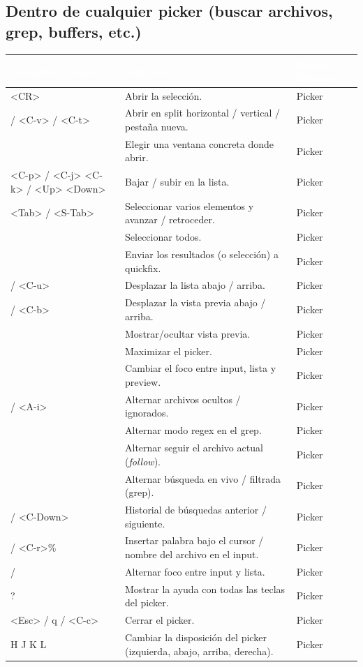\documentclass[8pt,a4paper,landscape]{extarticle}
\newenvironment{cht}{%
  \begin{longtable}{>{\raggedright\arraybackslash\ttfamily}p{0.27\textwidth}
                    >{\raggedright\arraybackslash}p{0.46\textwidth}
                    >{\raggedright\arraybackslash}p{0.21\textwidth}}
  \rowcolor{accent}\textcolor{white}{\textbf{\rmfamily Comando / atajo}} &
  \textcolor{white}{\textbf{Qué hace}} & \textcolor{white}{\textbf{Dónde funciona}} \\
  \endhead
}{\end{longtable}}
\newcommand{\rr}[3]{#1 & #2 & #3 \\}
\newcommand{\rg}[3]{\rowcolor{rowgray}\relax #1 & #2 & #3 \\}
\let\oldsubsection\subsection
\renewcommand{\subsection}{\Needspace{9\baselineskip}\oldsubsection}
\begin{document}
\subsection{Dentro de cualquier picker (buscar archivos, grep, buffers, etc.)}
\begin{cht}
\rg{<CR>}{Abrir la selección.}{Picker}
\rr{<C-s> / <C-v> / <C-t>}{Abrir en split horizontal / vertical / pestaña nueva.}{Picker}
\rg{<S-CR>}{Elegir una ventana concreta donde abrir.}{Picker}
\rr{<C-n> <C-p> / <C-j> <C-k> / <Up> <Down>}{Bajar / subir en la lista.}{Picker}
\rg{<Tab> / <S-Tab>}{Seleccionar varios elementos y avanzar / retroceder.}{Picker}
\rr{<C-a>}{Seleccionar todos.}{Picker}
\rg{<C-q>}{Enviar los resultados (o selección) a quickfix.}{Picker}
\rr{<C-d> / <C-u>}{Desplazar la lista abajo / arriba.}{Picker}
\rg{<C-f> / <C-b>}{Desplazar la vista previa abajo / arriba.}{Picker}
\rr{<A-p>}{Mostrar/ocultar vista previa.}{Picker}
\rg{<A-m>}{Maximizar el picker.}{Picker}
\rr{<A-w>}{Cambiar el foco entre input, lista y preview.}{Picker}
\rg{<A-h> / <A-i>}{Alternar archivos ocultos / ignorados.}{Picker}
\rr{<A-r>}{Alternar modo regex en el grep.}{Picker}
\rg{<A-f>}{Alternar seguir el archivo actual (\emph{follow}).}{Picker}
\rr{<C-g>}{Alternar búsqueda en vivo / filtrada (grep).}{Picker}
\rg{<C-Up> / <C-Down>}{Historial de búsquedas anterior / siguiente.}{Picker}
\rr{<C-r><C-w> / <C-r>\%}{Insertar palabra bajo el cursor / nombre del archivo en el input.}{Picker}
\rg{/}{Alternar foco entre input y lista.}{Picker}
\rr{? }{Mostrar la ayuda con todas las teclas del picker.}{Picker}
\rg{<Esc> / q / <C-c>}{Cerrar el picker.}{Picker}
\rr{<C-w>H J K L}{Cambiar la disposición del picker (izquierda, abajo, arriba, derecha).}{Picker}
\end{cht}
\end{document}
